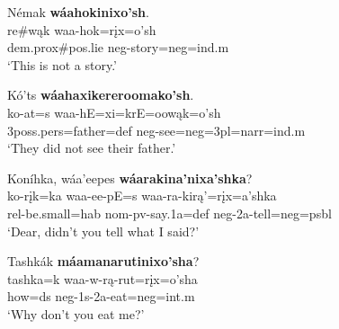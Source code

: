 \begin{exe}

\item\label{Ch5ExNegation} 

    \begin{xlist}
        \item\label{Ch5ExNegationA} \glll Némak \textbf{wáahokinixo'sh}.\\
        re\#wąk waa-hok=rįx=o'sh\\
        dem.prox\#pos.lie neg-\textnormal{story}=neg=ind.m\\
        \glt `This is not a story.' \citep[1]{trechter2012b}
        
        \item\label{Ch5ExNegationB} \glll Kó'ts \textbf{wáahaxikereroomako'sh}.\\
        ko-at=s waa-hE=xi=krE=oowąk=o'sh\\
        3poss.pers=\textnormal{father}=def neg-\textnormal{see}=neg=3pl=narr=ind.m\\
        \glt `They did not see their father.' \citep[209]{hollow1973a}

        \item\label{Ch5ExNegationC} \glll Koníhka, wáa'eepes \textbf{wáarakina'nixa'shka}?\\
        ko-rįk=ka waa-ee-pE=s waa-ra-kirą'=rįx=a'shka\\
        rel-\textnormal{be.small}=hab nom-pv-\textnormal{say}.1a=def neg-2a-\textnormal{tell}=neg=psbl\\
        \glt `Dear, didn't you tell what I said?' \citep[234]{hollow1973b}

        \item\label{Ch5ExNegationD} \glll Tashkák \textbf{máamanarutinixo'sha}?\\
        tashka=k waa-w-rą-rut=rįx=o'sha\\
        \textnormal{how}=ds neg-1s-2a-\textnormal{eat}=neg=int.m\\
        \glt `Why don't you eat me?' \citep[58]{hollow1973b}
        
    \end{xlist}


\end{exe}

